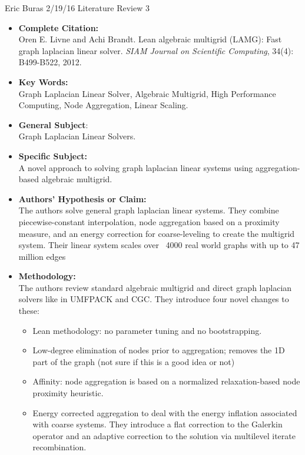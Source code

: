 \documentclass{article}
\begin{document}
Eric Buras 2/19/16 Literature Review 3
\\
\begin{itemize}
\setlength\itemsep{1em}
\item{\textbf{Complete Citation:}}
\\
Oren E. Livne and Achi Brandt. Lean algebraic multigrid (LAMG): Fast graph laplacian linear solver. \textit{SIAM Journal on Scientific Computing}, 34(4): B499-B522, 2012.

\item{\textbf{Key Words:}} 
\\
Graph Laplacian Linear Solver, Algebraic Multigrid, High Performance Computing, Node Aggregation, Linear Scaling.

\item{\textbf{General Subject}:}
\\
Graph Laplacian Linear Solvers.

\item{\textbf{Specific Subject:}}
\\
A novel approach to solving graph laplacian linear systems using aggregation-based algebraic multigrid. 

\item{\textbf{Authors' Hypothesis or Claim:}}
\\
The authors solve general graph laplacian linear systems. They combine piecewise-constant interpolation, node aggregation based on a proximity measure, and an energy correction for coarse-leveling to create the multigrid system. Their linear system scales over ~4000 real world graphs with up to 47 million edges

\item{\textbf{Methodology:}}
\\
The authors review standard algebraic multigrid and direct graph laplacian solvers like in UMFPACK and CGC. They introduce four novel changes to these:
\begin{itemize}
\item Lean methodology: no parameter tuning and no bootstrapping.
\item Low-degree elimination of nodes prior to aggregation; removes the 1D part of the graph (not sure if this is a good idea or not)
\item Affinity: node aggregation is based on a normalized relaxation-based node proximity heuristic.
\item Energy corrected aggregation to deal with the energy inflation associated with coarse systems. They introduce a flat correction to the Galerkin operator and an adaptive correction to the solution via multilevel iterate recombination. 
\end{itemize}


\end{itemize}
\end{document}
